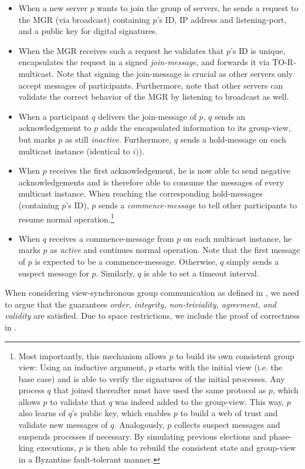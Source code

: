 \documentclass[runningheads]{llncs}
\begin{document}
\begin{enumerate}
    \begin{itemize}
        \item When a new server $p$ wants to join the group of servers, he sends a request to the MGR (via broadcast) containing $p$'s ID, IP address and listening-port, and a public key for digital signatures.
        \item When the MGR receives such a request he validates that $p$'s ID is unique, encapsulates the request in a signed \textit{join-message}, and forwards it via TO-R-multicast. Note that signing the join-message is crucial as other servers only accept messages of participants. Furthermore, note that other servers can validate the correct behavior of the MGR by listening to broadcast as well. 
        \item When a participant $q$ delivers the join-message of $p$, $q$ sends an acknowledgement to $p$ adds the encapsulated information to its group-view, but marks $p$ as still \textit{inactive}. Furthermore, $q$ sends a hold-message on each multicast instance (identical to $i)$). 
        \item When $p$ receives the first acknowledgement, he is now able to send negative acknowledgements and is therefore able to consume the messages of every multicast instance. When reaching the corresponding hold-messages (containing $p$'s ID), $p$ sends a \textit{commence-message} to tell other participants to resume normal operation.\footnote{Most importantly, this mechanism allows $p$ to build its own consistent group view: Using an inductive argument, $p$ starts with the initial view (i.e. the base case) and is able to verify the signatures of the initial processes. Any process $q$ that joined thereafter must have used the same protocol as $p$, which allows $p$ to validate that $q$ was indeed added to the group-view. This way, $p$ also learns of $q$'s public key, which enables $p$ to build a web of trust and validate new messages of $q$. Analogously, $p$ collects suspect messages and suspends processes if necessary. By simulating previous elections and phase-king executions, $p$ is then able to rebuild the consistent state and group-view in a Byzantine fault-tolerant manner. }
        \item When $q$ receives a commence-message from $p$ on each multicast instance, he marks $p$ as \textit{active} and continues normal operation. Note that the first message of $p$ is expected to be a commence-message. Otherwise, $q$ simply sends a suspect message for $p$. Similarly, $q$ is able to set a timeout interval.
    \end{itemize} 
\end{enumerate}
When considering view-synchronous group communication as defined in \cite[p. ~772-773]{ds_book}, we need to argue that the guarantees \textit{order, integrity, non-triviality, agreement, and validity} are satisfied. Due to space restrictions, we include the proof of correctness in .
\end{document}
